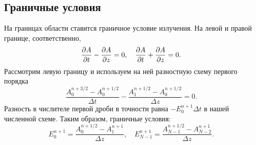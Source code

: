 \documentclass[DIV=11,12pt,a4paper]{scrartcl}
\begin{document}
\subsection{Граничные условия}
На границах области ставится граничное условие излучения.
На левой и правой границе, соответственно,
\begin{equation}
    \pdv{A}{t} - \pdv{A}{z} = 0, \quad \pdv{A}{t} + \pdv{A}{z} = 0.
\end{equation}
Рассмотрим левую границу и используем на ней разностную схему первого порядка
\begin{equation}
    \frac{A_0^{n+3/2} - A_0^{n+1/2}}{\Delta t} - \frac{A_1^{n+1/2} - A_0^{n+1/2}}{\Delta z} = 0.
\end{equation}
Разность в числителе первой дроби в точности равна $- E_0^{n+1} \Delta t$ в нашей численной схеме.
Таким образом, граничные условия:
\begin{equation}
    E_0^{n+1} = \frac{A_0^{n+1/2} - A_1^{n+1}}{\Delta z}, \quad E_{N-1}^{n+1} = \frac{A_{N-1}^{n+1/2} - A_{N-2}^{n+1}}{\Delta z}.
\end{equation}
\end{document}
